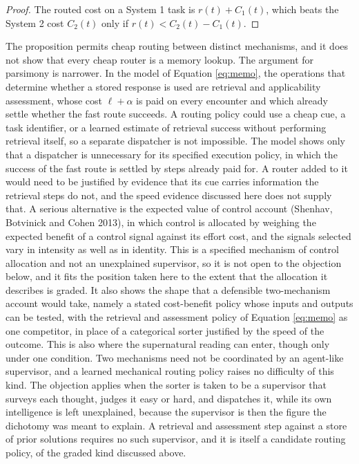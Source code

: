 \documentclass[11pt]{article}
\theoremstyle{definition}
\begin{document}
\begin{proof}
The routed cost on a System 1 task is $r(t)+C_1(t)$, which beats the System 2 cost $C_2(t)$ only if $r(t)<C_2(t)-C_1(t)$.
\end{proof}

The proposition permits cheap routing between distinct mechanisms, and it does not show that every cheap router is a memory lookup. The argument for parsimony is narrower. In the model of Equation \eqref{eq:memo}, the operations that determine whether a stored response is used are retrieval and applicability assessment, whose cost $\ell+\alpha$ is paid on every encounter and which already settle whether the fast route succeeds. A routing policy could use a cheap cue, a task identifier, or a learned estimate of retrieval success without performing retrieval itself, so a separate dispatcher is not impossible. The model shows only that a dispatcher is unnecessary for its specified execution policy, in which the success of the fast route is settled by steps already paid for. A router added to it would need to be justified by evidence that its cue carries information the retrieval steps do not, and the speed evidence discussed here does not supply that. A serious alternative is the expected value of control account (Shenhav, Botvinick and Cohen 2013), in which control is allocated by weighing the expected benefit of a control signal against its effort cost, and the signals selected vary in intensity as well as in identity. This is a specified mechanism of control allocation and not an unexplained supervisor, so it is not open to the objection below, and it fits the position taken here to the extent that the allocation it describes is graded. It also shows the shape that a defensible two-mechanism account would take, namely a stated cost-benefit policy whose inputs and outputs can be tested, with the retrieval and assessment policy of Equation \eqref{eq:memo} as one competitor, in place of a categorical sorter justified by the speed of the outcome. This is also where the supernatural reading can enter, though only under one condition. Two mechanisms need not be coordinated by an agent-like supervisor, and a learned mechanical routing policy raises no difficulty of this kind. The objection applies when the sorter is taken to be a supervisor that surveys each thought, judges it easy or hard, and dispatches it, while its own intelligence is left unexplained, because the supervisor is then the figure the dichotomy was meant to explain. A retrieval and assessment step against a store of prior solutions requires no such supervisor, and it is itself a candidate routing policy, of the graded kind discussed above.
\end{document}
